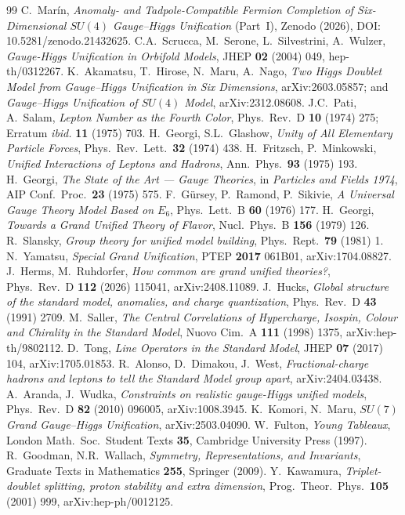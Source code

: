 \documentclass[11pt,a4paper]{article}
\begin{document}
\begin{thebibliography}{99}
 C.~Mar\'in, \emph{Anomaly- and Tadpole-Compatible Fermion Completion of
Six-Dimensional $SU(4)$ Gauge--Higgs Unification} (Part~I), Zenodo (2026),
DOI:\,10.5281/zenodo.21432625.
 C.A.~Scrucca, M.~Serone, L.~Silvestrini, A.~Wulzer, \emph{Gauge-Higgs
Unification in Orbifold Models}, JHEP \textbf{02} (2004) 049, hep-th/0312267.
 K.~Akamatsu, T.~Hirose, N.~Maru, A.~Nago, \emph{Two Higgs Doublet Model from
Gauge--Higgs Unification in Six Dimensions}, arXiv:2603.05857; and
\emph{Gauge--Higgs Unification of $SU(4)$ Model}, arXiv:2312.08608.
 J.C.~Pati, A.~Salam, \emph{Lepton Number as the Fourth Color},
Phys.\ Rev.\ D \textbf{10} (1974) 275; Erratum \emph{ibid.} \textbf{11} (1975) 703.
 H.~Georgi, S.L.~Glashow, \emph{Unity of All Elementary Particle
Forces}, Phys.\ Rev.\ Lett.\ \textbf{32} (1974) 438.
 H.~Fritzsch, P.~Minkowski, \emph{Unified Interactions of Leptons and
Hadrons}, Ann.\ Phys.\ \textbf{93} (1975) 193.
 H.~Georgi, \emph{The State of the Art --- Gauge Theories}, in
\emph{Particles and Fields 1974}, AIP Conf.\ Proc.\ \textbf{23} (1975) 575.
 F.~G\"ursey, P.~Ramond, P.~Sikivie, \emph{A Universal Gauge Theory Model Based
on $E_6$}, Phys.\ Lett.\ B \textbf{60} (1976) 177.
 H.~Georgi, \emph{Towards a Grand Unified Theory of Flavor},
Nucl.\ Phys.\ B \textbf{156} (1979) 126.
 R.~Slansky, \emph{Group theory for unified model building},
Phys.\ Rept.\ \textbf{79} (1981) 1.
 N.~Yamatsu, \emph{Special Grand Unification}, PTEP \textbf{2017} 061B01,
arXiv:1704.08827.
 J.~Herms, M.~Ruhdorfer, \emph{How common are grand unified
theories?}, Phys.\ Rev.\ D \textbf{112} (2026) 115041, arXiv:2408.11089.
 J.~Hucks, \emph{Global structure of the standard model, anomalies, and
charge quantization}, Phys.\ Rev.\ D \textbf{43} (1991) 2709.
 M.~Saller, \emph{The Central Correlations of Hypercharge, Isospin, Colour
and Chirality in the Standard Model}, Nuovo Cim.\ A \textbf{111} (1998) 1375,
arXiv:hep-th/9802112.
 D.~Tong, \emph{Line Operators in the Standard Model}, JHEP \textbf{07}
(2017) 104, arXiv:1705.01853.
 R.~Alonso, D.~Dimakou, J.~West, \emph{Fractional-charge hadrons and
leptons to tell the Standard Model group apart}, arXiv:2404.03438.
 A.~Aranda, J.~Wudka, \emph{Constraints on realistic gauge-Higgs
unified models}, Phys.\ Rev.\ D \textbf{82} (2010) 096005, arXiv:1008.3945.
 K.~Komori, N.~Maru, \emph{$SU(7)$ Grand Gauge--Higgs Unification},
arXiv:2503.04090.
 W.~Fulton, \emph{Young Tableaux}, London Math.\ Soc.\ Student Texts
\textbf{35}, Cambridge University Press (1997).
 R.~Goodman, N.R.~Wallach, \emph{Symmetry, Representations, and Invariants},
Graduate Texts in Mathematics \textbf{255}, Springer (2009).
 Y.~Kawamura, \emph{Triplet-doublet splitting, proton stability and
extra dimension}, Prog.\ Theor.\ Phys.\ \textbf{105} (2001) 999, arXiv:hep-ph/0012125.
\end{thebibliography}
\end{document}
